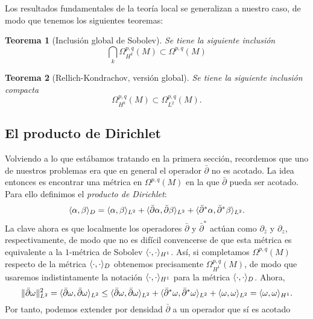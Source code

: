\documentclass[12pt,a4paper]{article}
\newtheorem{thm}{Teorema}[section]
\theoremstyle{definition} \newtheorem{defn}[thm]{Definición}
\theoremstyle{definition} \newtheorem{ejemplo}[thm]{Ejemplo}
\theoremstyle{definition} \newtheorem{ejercicio}[thm]{Ejercicio}
\theoremstyle{remark} \newtheorem*{obs}{Observación}
\DeclarePairedDelimiter\norm{\lVert}{\rVert}
\DeclarePairedDelimiter\esc{\langle}{\rangle}
\newcommand{\dol}{\bar{\partial}}
\begin{document}
   Los resultados fundamentales de la teoría local se generalizan a nuestro caso, de modo que tenemos los siguientes teoremas:
   \begin{thm}[Inclusión global de Sobolev]
     Se tiene la siguiente inclusión
     \begin{equation*}
     \bigcap_k\Omega^{p,q}_{H^k}(M)\subset \Omega^{p,q}(M)
     \end{equation*}
   \end{thm}
   \begin{thm}[Rellich-Kondrachov, versión global]
  Se tiene la siguiente inclusión compacta  $$\Omega_{H^k}^{p,q}(M) \subset \Omega_{L^2}^{p,q}(M).$$ 
   \end{thm}

   \subsection{El producto de Dirichlet}
   Volviendo a lo que estábamos tratando en la primera sección, recordemos que uno de nuestros problemas era que en general el operador $\dol$ no es acotado. La idea entonces es encontrar una métrica en $\Omega^{p,q}(M)$ en la que $\dol$ pueda ser acotado. Para ello definimos el \emph{producto de Dirichlet}:
   \begin{equation*}
     \esc{\alpha,\beta}_{D} = \esc{\alpha,\beta}_{L^2} + \esc{\dol \alpha, \dol \beta}_{L^2} + \esc{\dol^*\alpha, \dol^*\beta}_{L^2}.
   \end{equation*}
   La clave ahora es que localmente los operadores $\dol$ y $\dol^*$ actúan como $\partial_{\bar{z}}$ y $\partial_{z}$, respectivamente, de modo que no es difícil convencerse de que esta métrica es equivalente a la $1$-métrica de Sobolev $\esc{\cdot,\cdot}_{H^1}$. Así, si completamos $\Omega^{p,q}(M)$ respecto de la métrica $\esc{\cdot,\cdot}_D$ obtenemos precisamente $\Omega^{p,q}_{H^1}(M)$, de modo que usaremos indistintamente la notación $\esc{\cdot,\cdot}_{H^1}$ para la métrica $\esc{\cdot,\cdot}_D$. Ahora,
   \begin{equation*}
     \norm{\dol \omega}_{L^2}^2 = \esc{\dol \omega,\dol \omega}_{L^2} \leq \esc{\dol \omega, \dol \omega}_{L^2} + \esc{\dol^* \omega, \dol^*\omega}_{L^2} + \esc{\omega, \omega}_{L^2} = \esc{\omega,\omega}_{H^1}.
   \end{equation*}
   Por tanto, podemos extender por densidad $\dol$ a un operador que sí es acotado
   \begin{center}
    \end{center}
\end{document}
